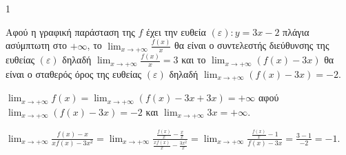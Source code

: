 \begin{ylh}{1}
    \item [Ύλη από εικόνα]
\end{ylh}
\begin{alist}
\item Αφού η γραφική παράσταση της $f$ έχει την ευθεία $(\varepsilon): y=3x-2$ πλάγια ασύμπτωτη στο $+\infty$, το $\lim_{x \to +\infty} \frac{f(x)}{x}$ θα είναι ο συντελεστής διεύθυνσης της ευθείας $(\varepsilon)$ δηλαδή $\lim_{x \to +\infty} \frac{f(x)}{x}=3$ και το $\lim_{x \to +\infty} (f(x)-3x)$ θα είναι ο σταθερός όρος της ευθείας $(\varepsilon)$ δηλαδή $\lim_{x \to +\infty} (f(x)-3x)=-2$.

\item $\lim_{x \to +\infty} f(x) = \lim_{x \to +\infty} (f(x)-3x+3x) = +\infty$ αφού $\lim_{x \to +\infty} (f(x)-3x)=-2$ και $\lim_{x \to +\infty} 3x = +\infty$.

\item $\lim_{x \to +\infty} \frac{f(x)-x}{xf(x)-3x^2} = \lim_{x \to +\infty} \frac{\frac{f(x)}{x}-\frac{x}{x}}{\frac{xf(x)}{x}-\frac{3x^2}{x}} = \lim_{x \to +\infty} \frac{\frac{f(x)}{x}-1}{f(x)-3x} = \frac{3-1}{-2} = -1$.
\end{alist}